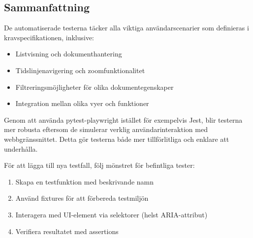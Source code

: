 \subsection{Sammanfattning}

De automatiserade testerna täcker alla viktiga användarscenarier som definieras i kravspecifikationen, inklusive:

\begin{itemize}
    \item Listvisning och dokumenthantering
    \item Tidslinjenavigering och zoomfunktionalitet
    \item Filtreringsmöjligheter för olika dokumentegenskaper
    \item Integration mellan olika vyer och funktioner
\end{itemize}

Genom att använda pytest-playwright istället för exempelvis Jest, blir testerna mer robusta eftersom de simulerar verklig användarinteraktion med webbgränssnittet. Detta gör testerna både mer tillförlitliga och enklare att underhålla.

För att lägga till nya testfall, följ mönstret för befintliga tester:
\begin{enumerate}
    \item Skapa en testfunktion med beskrivande namn
    \item Använd fixtures för att förbereda testmiljön
    \item Interagera med UI-element via selektorer (helst ARIA-attribut)
    \item Verifiera resultatet med assertions
\end{enumerate} 